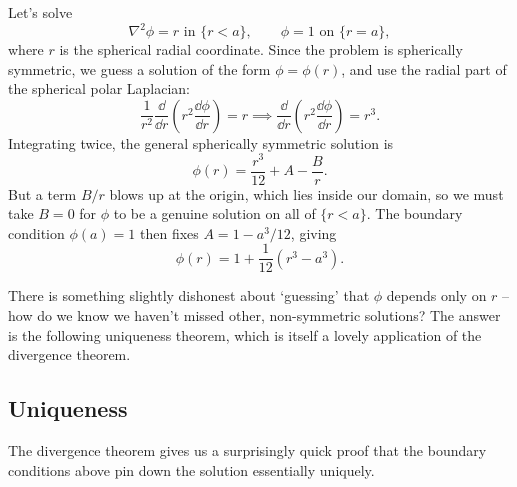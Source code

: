 \begin{example}
	Let's solve
	$$
	\nabla^2 \phi = r \text{ in } \{r < a\}, \quad \quad \phi = 1 \text{ on } \{r = a\},
	$$
	where $r$ is the spherical radial coordinate. Since the problem is spherically symmetric, we guess a solution of the form $\phi = \phi(r)$, and use the radial part of the spherical polar Laplacian:
	$$
	\frac{1}{r^2}\frac{\dd}{\dd r}\left(r^2 \frac{\dd \phi}{\dd r}\right) = r \implies \frac{\dd}{\dd r}\left(r^2 \frac{\dd \phi}{\dd r}\right) = r^3.
	$$
	Integrating twice, the general spherically symmetric solution is
	$$
	\phi(r) = \frac{r^3}{12} + A - \frac{B}{r}.
	$$
	But a term $B/r$ blows up at the origin, which lies inside our domain, so we must take $B = 0$ for $\phi$ to be a genuine solution on all of $\{r < a\}$. The boundary condition $\phi(a) = 1$ then fixes $A = 1 - a^3/12$, giving
	$$
	\phi(r) = 1 + \frac{1}{12}\left(r^3 - a^3\right).
	$$
\end{example}

There is something slightly dishonest about `guessing' that $\phi$ depends only on $r$ -- how do we know we haven't missed other, non-symmetric solutions? The answer is the following uniqueness theorem, which is itself a lovely application of the divergence theorem.

\subsection{Uniqueness}

The divergence theorem gives us a surprisingly quick proof that the boundary conditions above pin down the solution essentially uniquely.

